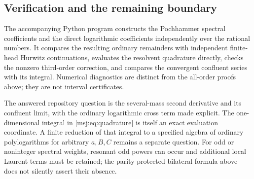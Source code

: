 \subsection{Verification and the remaining boundary}

The accompanying Python program constructs the Pochhammer spectral
coefficients and the direct logarithmic coefficients independently over
the rational numbers. It compares the resulting ordinary remainders
with independent finite-head Hurwitz continuations, evaluates the
resolvent quadrature directly, checks the nonzero third-order correction,
and compares the convergent confluent series with its integral.
Numerical diagnostics are distinct from the all-order proofs above;
they are not interval certificates.

The answered repository question is the several-mass second derivative
and its confluent limit, with the ordinary logarithmic cross term made
explicit. The one-dimensional integral in \eqref{msj:eq:quadrature}
is itself an exact evaluation coordinate. A finite reduction of that
integral to a specified algebra of ordinary polylogarithms for arbitrary
$a,B,C$ remains a separate question. For odd or noninteger spectral
weights, resonant odd powers can occur and additional local Laurent
terms must be retained; the parity-protected bilateral formula above
does not silently assert their absence.
